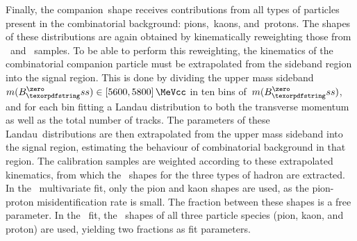 Finally, the companion~\dllkpi shape receives contributions from all types of particles present in the combinatorial background: pions,~kaons, and~protons.
The shapes of these distributions are again obtained by kinematically reweighting those from \Dstar~and \Lz~samples.
To be able to perform this reweighting, the kinematics of the combinatorial companion particle must be extrapolated from the sideband region into the signal region.
This is done by dividing the upper mass sideband~\({m(\Bs) \in \SI[parse-numbers=false]{[\num{5600}, \num{5800}]}{\MeVcc}}\) in ten bins of~\({m(\Bs)}\), and for each bin fitting a Landau distribution to both the transverse momentum as well as the total number of tracks.
The parameters of these Landau~distributions are then extrapolated from the upper mass sideband into the signal region, estimating the behaviour of combinatorial background in that region.
The calibration samples are weighted according to these extrapolated kinematics, from which the \dllkpi~shapes for the three types of hadron are extracted.
In the \BsDsPi~multivariate fit, only the pion and kaon shapes are used, as the pion-proton misidentification rate is small.
The fraction between these shapes is a free parameter.
In the \BsDsK~fit, the \dllkpi~shapes of all three particle species (pion, kaon, and proton) are used, yielding two fractions as fit parameters.

